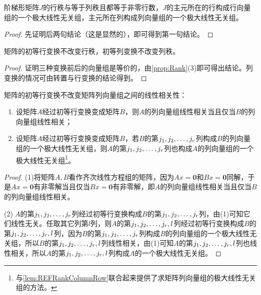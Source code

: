 \begin{lemma}\label{lem:REFRankColumnRow}
	阶梯形矩阵$J$的行秩与等于列秩且都等于非零行数，$J$的主元所在的行构成行向量组的一个极大线性无关组，主元所在列构成列向量组的一个极大线性无关组。
\end{lemma}
\begin{proof}
	先证明后两句结论（这是显然的），即可得到第一句结论。
\end{proof}
\begin{lemma}\label{lem:ElementaryRowColumnTransRank}
	矩阵的初等行变换不改变行秩，初等列变换不改变列秩。
\end{lemma}
\begin{proof}
	证明三种变换前后的向量组是等价的，由\cref{prop:Rank}(3)即可得出结论。列变换的情况可由转置与行变换的结论得到。
\end{proof}
\begin{lemma}\label{lem:ElementaryRowSameColumn}
	矩阵的初等行变换不改变矩阵列向量组之间的线性相关性：
	\begin{enumerate}
		\item 设矩阵$A$经过初等行变换变成矩阵$B$，则$A$的列向量组线性相关当且仅当$B$的列向量组线性相关；
		\item 设矩阵$A$经过初等行变换变成矩阵$B$，若$B$的第$j_1, j_2, \dots, j_{r}$列构成$B$的列向量组的一个极大线性无关组，则$A$的第$j_1, j_2, \dots, j_{r}$列也构成$A$的列向量组的一个极大线性无关组\footnote{与\cref{lem:REFRankColumnRow}联合起来提供了求矩阵列向量组的极大线性无关组的方法。}。
	\end{enumerate}
\end{lemma}
\begin{proof}
	(1)将矩阵$A,B$看作齐次线性方程组的矩阵，因为$Ax=\mathbf{0}$和$Bx=\mathbf{0}$同解，于是$Ax=\mathbf{0}$有非零解当且仅当$Bx=\mathbf{0}$有非零解，即$A$的列向量组线性相关当且仅当$B$的列向量组线性相关。\par
	(2)$\;A$的第$j_1, j_2, \dots, j_{r}$列经过初等行变换构成$B$的第$j_1, j_2, \dots, j_{r}$列，由(1)可知它们线性无关。任取其它列第$l$列，则$A$的第$j_1, j_2, \dots, j_{r},l$列经过初等行变换构成$B$的第$j_1, j_2, \dots, j_{r},l$列，因为$B$的第$j_1, j_2, \dots, j_{r}$列构成$B$的列向量组的一个极大线性无关组，所以$B$的第$j_1, j_2, \dots, j_{r},l$列线性相关，由(1)可知$A$的第$j_1, j_2, \dots, j_{r},l$列也线性相关，所以$A$的第$j_1, j_2, \dots, j_{r},l$列构成$A$的一个极大线性无关组。
\end{proof}
